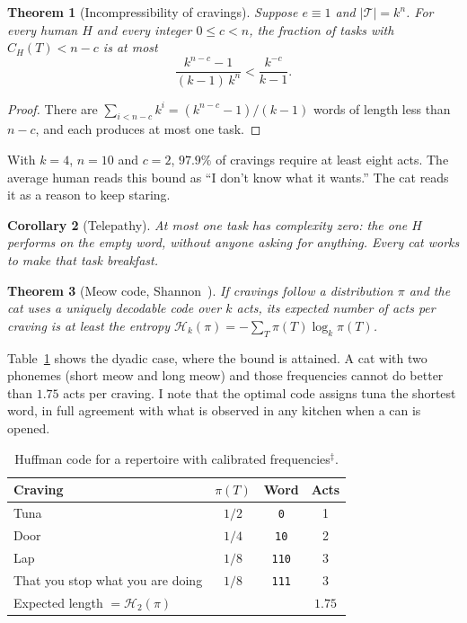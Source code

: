 \documentclass[11pt,a4paper]{article}
\theoremstyle{plain}
\newtheorem{teorema}{Theorem}[section]
\newtheorem{corolario}[teorema]{Corollary}
\theoremstyle{definition}
\theoremstyle{remark}
\numberwithin{equation}{section}
\newcommand{\cg}{C}
\newcommand{\calib}{{\ensuremath{^{\ddagger}}}}
\begin{document}
\begin{teorema}[Incompressibility of cravings]\label{teo:incompresible}
Suppose $e\equiv 1$ and $|\mathcal T|=k^n$. For every human $H$ and every integer $0\le c<n$, the fraction of tasks with $\cg_H(T)<n-c$ is at most
\begin{equation}
  \frac{k^{n-c}-1}{(k-1)\,k^{n}}<\frac{k^{-c}}{k-1}.
\end{equation}
\end{teorema}

\begin{proof}
There are $\sum_{i<n-c}k^i=(k^{n-c}-1)/(k-1)$ words of length less than $n-c$, and each produces at most one task.
\end{proof}

With $k=4$, $n=10$ and $c=2$, $97.9\%$ of cravings require at least eight acts. The average human reads this bound as ``I don't know what it wants.'' The cat reads it as a reason to keep staring.

\begin{corolario}[Telepathy]
At most one task has complexity zero: the one $H$ performs on the empty word, without anyone asking for anything. Every cat works to make that task breakfast.
\end{corolario}

\begin{teorema}[Meow code, Shannon~\cite{shannon}]\label{teo:codigo}
If cravings follow a distribution $\pi$ and the cat uses a uniquely decodable code over $k$ acts, its expected number of acts per craving is at least the entropy $\mathcal H_k(\pi)=-\sum_T\pi(T)\log_k\pi(T)$.
\end{teorema}

Table~\ref{tab:codigo} shows the dyadic case, where the bound is attained. A cat with two phonemes (short meow and long meow) and those frequencies cannot do better than $1.75$ acts per craving. I note that the optimal code assigns tuna the shortest word, in full agreement with what is observed in any kitchen when a can is opened.

\begin{table}[ht]
\centering
\caption{Huffman code for a repertoire with calibrated frequencies\calib.}\label{tab:codigo}
\begin{tabular}{lccc}
\toprule
Craving & $\pi(T)$ & Word & Acts \\
\midrule
Tuna & $1/2$ & \texttt{0} & 1 \\
Door & $1/4$ & \texttt{10} & 2 \\
Lap & $1/8$ & \texttt{110} & 3 \\
That you stop what you are doing & $1/8$ & \texttt{111} & 3 \\
\midrule
\multicolumn{2}{l}{Expected length $=\mathcal H_2(\pi)$} & & $1.75$ \\
\bottomrule
\end{tabular}
\end{table}
\end{document}

